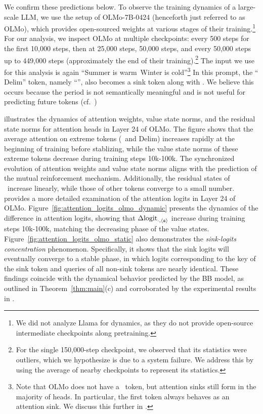 We confirm these predictions below. To observe the training dynamics of a large-scale LLM, we use the setup of OLMo-7B-0424 \citep{groeneveld2024olmo} (henceforth just referred to as OLMo), which provides open-sourced weights at various stages of their training.\footnote{We did not analyze Llama for dynamics, as they do not provide open-source intermediate checkpoints along pretraining.} For our analysis, we inspect OLMo at multiple checkpoints: every 500 steps for the first 10,000 steps, then at 25,000 steps, 50,000 steps, and every 50,000 steps up to 449,000 steps (approximately the end of their training).\footnote{For the single 150,000-step checkpoint, we observed that its statistics were outliers, which we hypothesize is due to a system failure. We address this by using the average of nearby checkpoints to represent its statistics.} The input we use for this analysis is again ``Summer is warm\period~Winter is cold\period''\footnote{Note that OLMo does not have a \bos~token, but attention sinks still form in the majority of heads. In particular, the first token always behaves as an attention sink. We discuss this further in .} In this prompt, the ``$\mathrm{Delim}$'' token, namely ``\period'', also becomes a sink token along with \bos. We believe this occurs because the period is not semantically meaningful and is not useful for predicting future tokens (cf.\  ) 


 illustrates the dynamics of attention weights, value state norms, and the residual state norms for attention heads in Layer 24 of OLMo. The figure shows that the average attention on extreme tokens (\bos~and $\mathrm{Delim}$) increases rapidly at the beginning of training before stablizing, while the value state norms of these extreme tokens decrease during training steps 10k-100k. The synchronized evolution of attention weights and value state norms aligns with the prediction of the mutual reinforcement mechanism.  Additionally, the residual states of \bos~increase linearly, while those of other tokens converge to a small number.  provides a more detailed examination of the attention logits in Layer 24 of OLMo. Figure~\ref{fig:attention_logits_olmo_dynamic} presents the dynamics of the difference in attention logits, showing that $\Delta \text{logit}_{\cdot,\texttt{$\langle \texttt{s}\rangle$}}$ increase during training steps 10k-100k, matching the decreasing phase of the value states.
Figure~\ref{fig:attention_logits_olmo_static} also demonstrates the \textit{sink-logits concentration} phenomenon. Specifically, it shows that the sink logits will eventually converge to a stable phase, in which logits corresponding to the key of the sink token and queries of all non-sink tokens are nearly identical. These findings coincide with the dynamical behavior predicted by the BB model, as outlined in Theorem~\ref{thm:main}(c) and corroborated by the experimental results in . 


